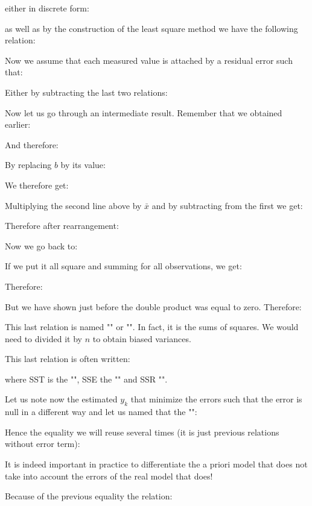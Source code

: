 	either in discrete form:
	
	as well as by the construction of the least square method we have the following relation:
	
	Now we assume that each measured value is attached by a residual error such that:
	
	Either by subtracting the last two relations:
	
	Now let us go through an intermediate result. Remember that we obtained earlier:
	
	And therefore:
	
	By replacing $b$ by its value:
	
	We therefore get:
	
	Multiplying the second line above by $\bar{x}$ and by subtracting from the first we get:
	
	Therefore after rearrangement:
	
	Now we go back to:
	
	If we put it all square and summing for all observations, we get:
	
	Therefore:
	
	But we have shown just before the double product was equal to zero. Therefore:
	
	This last relation is named "" or "". In fact, it is the sums of squares. We would need to divided it by $n$ to obtain biased variances.
	
	This last relation is often written:
	
	where SST is the "", SSE the "" and SSR "".
	
	Let us note now the estimated $y_k$ that minimize the errors such that the error is null in a different way and let us named that the "":
	
	Hence the equality we will reuse several times (it is just previous relations without error term):
	
	It is indeed important in practice to differentiate the a priori model that does not take into account the errors of the real model that does!
	
	Because of the previous equality the relation:
	
